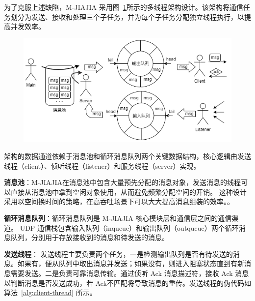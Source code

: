 {\begin{enumerate}[label=\arabic*.]
    为了克服上述缺陷，M-JIAJIA 采用图~\ref{fig:mjiajia-multithread}所示的多线程架构设计。该架构将通信任务划分为发送、接收和处理三个子任务，并为每个子任务分配独立线程执行，以提高并发效率。
    \begin{figure}[H]
        \centering
        \includegraphics[width=1.0\textwidth]{Img/Multithread-arch.png}
        \label{fig:mjiajia-multithread}
    \end{figure}

    架构的数据通道依赖于消息池和循环消息队列两个关键数据结构，核心逻辑由发送线程（client）、侦听线程（listener）和服务线程（server）实现。

    \textbf{消息池}：M-JIAJIA在消息池中包含大量预先分配的消息对象，发送消息的线程可以直接从消息池中拿到空闲对象使用，从而避免频繁分配空间的开销。
    这种设计采用以空间换时间的策略，在高吞吐场景下可以大大提高消息组装的效率。。

    \textbf{循环消息队列}：循环消息队列是 M-JIAJIA 核心模块层和通信层之间的通信渠道。
    UDP 通信栈包含输入队列（inqueue）和输出队列（outqueue）两个循环消息队列，分别用于存放接收到的消息和待发送的消息。

    \textbf{发送线程}： 发送线程主要负责两个任务，一是检测输出队列是否有待发送的消息。如果有，便从队列中取出消息并发送；如果没有，则进入阻塞状态直到有新消息需要发送。二是负责可靠消息传输。通过侦听 Ack 消息描述符，接收 Ack 消息以判断消息是否发送成功，若 Ack不匹配将导致消息的重传。发送线程的伪代码如算法~\ref{alg:client-thread} 所示。


\end{enumerate}}
